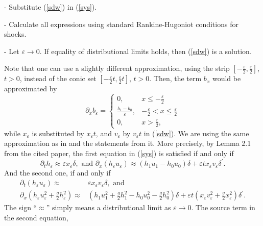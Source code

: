 \documentclass{article}
\theoremstyle{plain}
\theoremstyle{definition}
\theoremstyle{remark}
\begin{document}
\noindent - Substitute (\ref{sdw}) in (\ref{sys}).

\noindent - Calculate all expressions using standard Rankine-Hugoniot
conditions for shocks.

\noindent - Let $\varepsilon \to 0$. If equality of 
distributional limits holds, then (\ref{sdw}) is a solution.
\medskip

Note that one can use a slightly different approximation, using 
the strip $\left[-\frac{\varepsilon}{2},\frac{\varepsilon}{2}\right]$, $t>0$,
instead of the conic set $\left[-\frac{\varepsilon}{2}t,\frac{\varepsilon}{2}t\right]$, $t>0$.
Then, the term $b_{x}$ would be approximated by
\[\partial_{x}b_{\varepsilon} = \begin{cases}
0, &  x \leq - \frac{\varepsilon}{2} \\
\frac{b_{1} - b_{0}}{\varepsilon}, &  - \frac{\varepsilon}{2} < x \leq \frac{\varepsilon}{2} \\
0, &  x > \frac{\varepsilon}{2}, 
\end{cases}\]
while $x_{\varepsilon}$ is substituted by $x_{\varepsilon}t$,
and $v_{\varepsilon}$ by $v_{\varepsilon}t$ in (\ref{sdw}). 
We are using the same approximation as in \cite{MN2010} and 
the statements from it. More precisely, 
by Lemma 2.1 from the cited paper, the first equation in (\ref{sys}) 
is satisfied if and only if
\begin{equation*}
\partial_{t}h_{\varepsilon} \approx \varepsilon x_{\varepsilon}\delta, 
\text{ and } \partial_{x}\left( h_{\varepsilon}u_{\varepsilon} \right) 
\approx \left( h_{1}u_{1} - h_{0}u_{0} \right)\delta + \varepsilon 
tx_{\varepsilon}v_{\varepsilon}\delta^{'}.
\end{equation*}
And the second one, if and only if 
\begin{equation*}
\begin{split}
\partial_{t}\left( h_{\varepsilon}u_{\varepsilon} \right) \approx 
& \varepsilon x_{\varepsilon}v_{\varepsilon}\delta, \text{ and }\\
\partial_{x}\left( h_{\varepsilon}u_{\varepsilon}^{2}
+ \frac{g}{2}h_{\varepsilon}^{2} \right) \approx & \left( h_{1}u_{1}^{2} 
+ \frac{g}{2}h_{1}^{2} - h_{0}u_{0}^{2} - \frac{g}{2}h_{0}^{2} \right)\delta
+ \varepsilon t\left( x_{\varepsilon}v_{\varepsilon}^{2} 
+ \frac{g}{2}x_{\varepsilon}^{2} \right)\delta^{'}.
\end{split}
\end{equation*}
The sign ``$\approx$'' simply means a distributional limit as
$\varepsilon \to 0$. 
The source term in the second equation,
\end{document}
